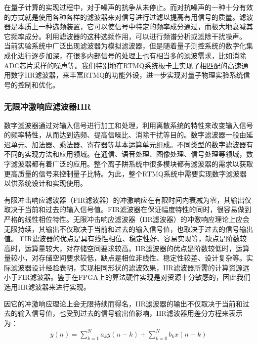 在量子计算的实现过程中，对于噪声的抗争从未停止。而对抗噪声的一种十分有效的方式就是使用各种各样的滤波器来对信号进行过滤以提高有用信号的质量。滤波器是本质上一种选频装置，它可以使信号中特定的频率成分通过，而极大地衰减其它频率成分。利用滤波器的这种选频作用，可以进行频谱分析或滤除干扰噪声。
当前实验系统中广泛出现滤波器为模拟滤波器，但是随着量子测控系统的数字化集成化进行逐步加深，在很多内部信号的处理上也有相当多的滤波需求，比如消除ADC芯片采样的噪声等。我们特别地在RTMQ系统板卡上实现了相匹配的高速通用数字IIR滤波器，来丰富RTMQ的功能外设，进一步实现对量子物理实验系统信号的控制和优化。


\subsubsection[无限冲激响应滤波器IIR]{无限冲激响应滤波器IIR}
数字滤波器通过对输入信号进行加工和处理，利用离散系统的特性来改变输入信号的频率特性，从而达到选频、提高信噪比、消除干扰等目的。数字滤波器一般由延迟单元、加法器、乘法器、寄存器等基本运算单元组成。不同类型的数字滤波器有不同的实现方法和应用领域。在通信、语音处理、图像处理、信号处理等领域，数字滤波器都有着广泛的应用。整个离子阱系统中很多模块都有滤波器的需求以获取更高质量的信号来控制量子比特。为此，整个RTMQ系统中需要实现数字滤波器以供系统设计和实现使用。

有限冲击响应滤波器（FIR滤波器）的冲激响应在有限时间内衰减为零，其输出仅取决于当前和过去的输入信号值。FIR滤波器在保证幅度特性的同时，很容易做到严格的线性相位特性。无限冲击响应滤波器（IIR滤波器）的冲激响应理论上应会无限持续，其输出不仅取决于当前和过去的输入信号值，也取决于过去的信号输出值。
FIR滤波器的优点是具有线性相位、稳定性好、容易实现等，缺点是阶数较高时，运算量较大，对存储空间要求较高。IIR滤波器的优点是阶数较低时，运算量较小，对存储空间要求较低，缺点是相位非线性、稳定性较差、设计复杂等。实际滤波器设计经验表明，实现相同形状的滤波效果，IIR滤波器所需的计算资源远小于FIR滤波器。鉴于在FPGA上的算法硬件实现是对资源十分敏感的，因此我们选用IIR滤波器来进行实现。

因它的冲激响应理论上会无限持续而得名，IIR滤波器的输出不仅取决于当前和过去的输入信号值，也受到过去的信号输出值影响，IIR滤波器用差分方程来表示为：
\begin{align}
    y(n)=\sum_{k=1}^Na_ky(n-k)+\sum_{k=0}^Nb_kx(n-k)\label{eq:iir_filter}
\end{align}


